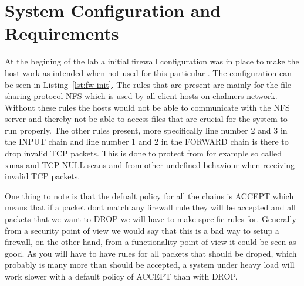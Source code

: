 \section{System Configuration and Requirements}
\label{sec:setup}

At the begining of the lab a initial firewall configuration was in place to make the host work as intended when not used for this particular \lab. The configuration can be seen in Listing~\ref{lst:fw-init}. The rules that are present are mainly for the file sharing protocol NFS which is used by all client hosts on chalmers network. Without these rules the hosts would not be able to communicate with the NFS server and thereby not be able to access files that are crucial for the system to run properly. The other rules present, more specifically line number 2 and 3 in the INPUT chain and line number 1 and 2 in the FORWARD chain is there to drop invalid TCP packets. This is done to protect from for example so called xmas and TCP NULL scans and from other undefined behaviour when receiving invalid TCP packets.

One thing to note is that the defualt policy for all the chains is ACCEPT which means that if a packet dont match any firewall rule they will be accepted and all packets that we want to DROP we will have to make specific rules for. Generally from a security point of view we would say that this is a bad way to setup a firewall, on the other hand, from a functionality point of view it could be seen as good. As you will have to have rules for all packets that should be droped, which probably is many more than should be accepted, a system under heavy load will work slower with a default policy of ACCEPT than with DROP.  



